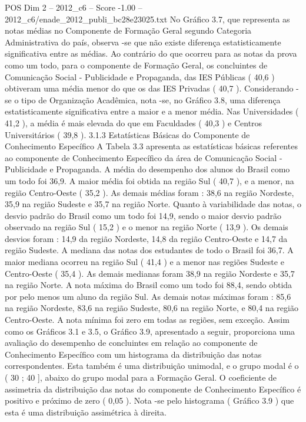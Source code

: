 \begin{textsample}{POS Dim 2 – 2012\_c6 – Score -1.00 – 2012\_c6/enade\_2012\_publi\_bc28e23025.txt}
No Gráfico 3.7, que representa as notas médias no Componente de Formação Geral segundo Categoria Administrativa do país, observa -se que não existe diferença estatisticamente significativa entre as médias.
Ao contrário do que ocorreu para as notas da prova como um todo, para o componente de Formação Geral, os concluintes de Comunicação Social - Publicidade e Propaganda, das IES Públicas ( 40,6 ) obtiveram uma média menor do que os das IES Privadas ( 40,7 ).
Considerando -se o tipo de Organização Acadêmica, nota -se, no Gráfico 3.8, uma diferença estatisticamente significativa entre a maior e a menor média.
Nas Universidades ( 41,2 ), a média é mais elevada do que em Faculdades ( 40,3 ) e Centros Universitários ( 39,8 ). 3.1.3 Estatísticas Básicas do Componente de Conhecimento Específico A Tabela 3.3 apresenta as estatísticas básicas referentes ao componente de Conhecimento Específico da área de Comunicação Social - Publicidade e Propaganda.
A média do desempenho dos alunos do Brasil como um todo foi 36,9.
A maior média foi obtida na região Sul ( 40,7 ), e a menor, na região Centro-Oeste ( 35,2 ).
As demais médias foram : 38,6 na região Nordeste, 35,9 na região Sudeste e 35,7 na região Norte.
Quanto à variabilidade das notas, o desvio padrão do Brasil como um todo foi 14,9, sendo o maior desvio padrão observado na região Sul ( 15,2 ) e o menor na região Norte ( 13,9 ).
Os demais desvios foram : 14,9 da região Nordeste, 14,8 da região Centro-Oeste e 14,7 da região Sudeste.
A mediana das notas dos estudantes de todo o Brasil foi 36,7.
A maior mediana ocorreu na região Sul ( 41,4 ) e a menor nas regiões Sudeste e Centro-Oeste ( 35,4 ).
As demais medianas foram 38,9 na região Nordeste e 35,7 na região Norte.
A nota máxima do Brasil como um todo foi 88,4, sendo obtida por pelo menos um aluno da região Sul.
As demais notas máximas foram : 85,6 na região Nordeste, 83,6 na região Sudeste, 80,6 na região Norte, e 80,4 na região Centro-Oeste.
A nota mínima foi zero em todas as regiões, sem exceção.
Assim como os Gráficos 3.1 e 3.5, o Gráfico 3.9, apresentado a seguir, proporciona uma avaliação do desempenho de concluintes em relação ao componente de Conhecimento Específico com um histograma da distribuição das notas correspondentes.
Esta também é uma distribuição unimodal, e o grupo modal é o ( 30 ; 40 ], abaixo do grupo modal para a Formação Geral.
O coeficiente de assimetria da distribuição das notas do componente de Conhecimento Específico é positivo e próximo de zero ( 0,05 ).
Nota -se pelo histograma ( Gráfico 3.9 ) que esta é uma distribuição assimétrica à direita.

\end{textsample}
